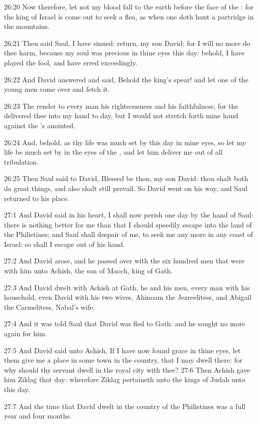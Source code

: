 26:20 Now therefore, let not my blood fall to the earth before the face of the \LORD: for the king of Israel is come out to seek a flea, as when one doth hunt a partridge in the mountains.

26:21 Then said Saul, I have sinned: return, my son David: for I will no more do thee harm, because my soul was precious in thine eyes this day: behold, I have played the fool, and have erred exceedingly.

26:22 And David answered and said, Behold the king's spear! and let one of the young men come over and fetch it.

26:23 The \LORD render to every man his righteousness and his faithfulness; for the \LORD delivered thee into my hand to day, but I would not stretch forth mine hand against the \LORD's anointed.

26:24 And, behold, as thy life was much set by this day in mine eyes, so let my life be much set by in the eyes of the \LORD, and let him deliver me out of all tribulation.

26:25 Then Saul said to David, Blessed be thou, my son David: thou shalt both do great things, and also shalt still prevail. So David went on his way, and Saul returned to his place.

27:1 And David said in his heart, I shall now perish one day by the hand of Saul: there is nothing better for me than that I should speedily escape into the land of the Philistines; and Saul shall despair of me, to seek me any more in any coast of Israel: so shall I escape out of his hand.

27:2 And David arose, and he passed over with the six hundred men that were with him unto Achish, the son of Maoch, king of Gath.

27:3 And David dwelt with Achish at Gath, he and his men, every man with his household, even David with his two wives, Ahinoam the Jezreelitess, and Abigail the Carmelitess, Nabal's wife.

27:4 And it was told Saul that David was fled to Gath: and he sought no more again for him.

27:5 And David said unto Achish, If I have now found grace in thine eyes, let them give me a place in some town in the country, that I may dwell there: for why should thy servant dwell in the royal city with thee?  27:6 Then Achish gave him Ziklag that day: wherefore Ziklag pertaineth unto the kings of Judah unto this day.

27:7 And the time that David dwelt in the country of the Philistines was a full year and four months.

